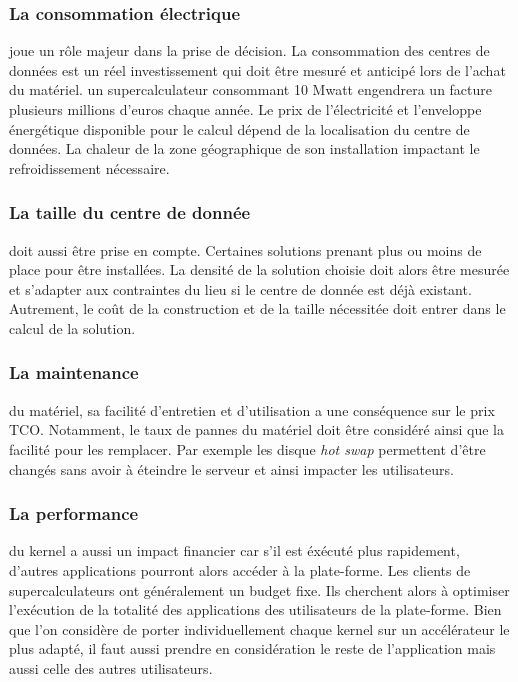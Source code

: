 \subsubsection{La consommation électrique} joue un rôle majeur dans la prise de décision. La consommation des centres de données est un réel investissement qui doit être mesuré et anticipé lors de l'achat du matériel. un supercalculateur consommant 10 Mwatt engendrera un facture plusieurs millions d'euros chaque année. Le prix de l'électricité et l'enveloppe énergétique disponible pour le calcul dépend de la localisation du centre de données. La chaleur de la zone géographique de son installation impactant le refroidissement nécessaire.

\subsubsection{La taille du centre de donnée} doit aussi être prise en compte. Certaines solutions prenant plus ou moins de place pour être installées. La densité de la solution choisie doit alors être mesurée et s'adapter aux contraintes du lieu si le centre de donnée est déjà existant. Autrement, le coût de la construction et de la taille nécessitée doit entrer dans le calcul de la solution.


\subsubsection{La maintenance } du matériel, sa facilité d'entretien et d'utilisation a une conséquence sur le prix $\text{TCO}$. Notamment, le taux de pannes du matériel doit être considéré ainsi que la facilité pour les remplacer. Par exemple les disque \textit{hot swap} permettent d'être changés sans avoir à éteindre le serveur et ainsi impacter les utilisateurs.

\subsubsection{La performance } du kernel a aussi un impact financier car s'il est éxécuté plus rapidement, d'autres applications pourront alors accéder à la plate-forme. Les clients de supercalculateurs ont généralement un budget fixe. Ils cherchent alors à optimiser l'exécution de la totalité des applications des utilisateurs de la plate-forme. Bien que l'on considère de porter individuellement chaque kernel sur un accélérateur le plus adapté, il faut aussi prendre en considération le reste de l'application mais aussi celle des autres utilisateurs.




